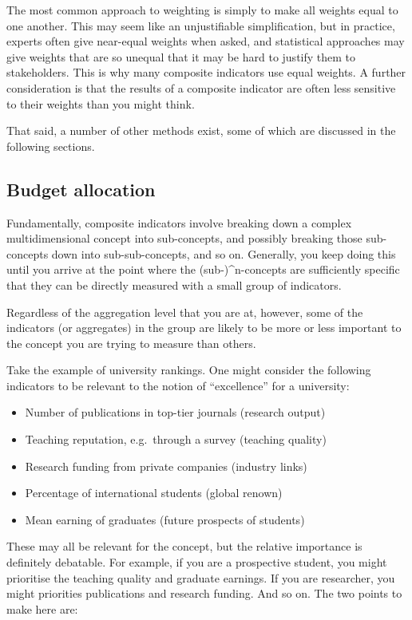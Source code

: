 \documentclass[
]{book}
\providecommand{\tightlist}{%
  \setlength{\itemsep}{0pt}\setlength{\parskip}{0pt}}
\begin{document}
The most common approach to weighting is simply to make all weights equal to one another. This may seem like an unjustifiable simplification, but in practice, experts often give near-equal weights when asked, and statistical approaches may give weights that are so unequal that it may be hard to justify them to stakeholders. This is why many composite indicators use equal weights. A further consideration is that the results of a composite indicator are often less sensitive to their weights than you might think.

That said, a number of other methods exist, some of which are discussed in the following sections.

\hypertarget{budget-allocation}{%
\subsection{Budget allocation}\label{budget-allocation}}

Fundamentally, composite indicators involve breaking down a complex multidimensional concept into sub-concepts, and possibly breaking those sub-concepts down into sub-sub-concepts, and so on. Generally, you keep doing this until you arrive at the point where the (sub-)\^{}n-concepts are sufficiently specific that they can be directly measured with a small group of indicators.

Regardless of the aggregation level that you are at, however, some of the indicators (or aggregates) in the group are likely to be more or less important to the concept you are trying to measure than others.

Take the example of university rankings. One might consider the following indicators to be relevant to the notion of ``excellence'' for a university:

\begin{itemize}
\tightlist
\item
  Number of publications in top-tier journals (research output)
\item
  Teaching reputation, e.g.~through a survey (teaching quality)
\item
  Research funding from private companies (industry links)
\item
  Percentage of international students (global renown)
\item
  Mean earning of graduates (future prospects of students)
\end{itemize}

These may all be relevant for the concept, but the relative importance is definitely debatable. For example, if you are a prospective student, you might prioritise the teaching quality and graduate earnings. If you are researcher, you might priorities publications and research funding. And so on. The two points to make here are:
\end{document}
